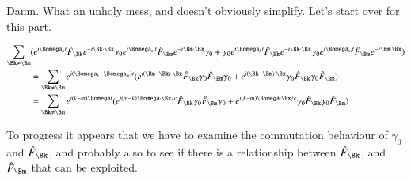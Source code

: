 \documentclass{article}
\begin{document}
Damn.  What an unholy mess, and doesn't obviously simplify.  Let's start over for this part.

\begin{align*}
\sum_{\Bk \ne \Bm} &(
e^{i \Bomega_k t} 
\hat{F}_{\Bk} 
e^{-i \Bk \cdot \Bx} 
\gamma_0 
e^{i \Bomega_m t} 
\hat{F}_{\Bm} 
e^{-i \Bm \cdot \Bx} 
\gamma_0
+ \gamma_0 
e^{i \Bomega_k t} 
\hat{F}_{\Bk} 
e^{-i \Bk \cdot \Bx} 
\gamma_0 
e^{i \Bomega_m t} 
\hat{F}_{\Bm} 
e^{-i \Bm \cdot \Bx} 
) \\
&=
\sum_{\Bk \ne \Bm} 
e^{i (\Bomega_k -\Bomega_m) t}
(
e^{ i (\Bm -\Bk)\cdot \Bx} 
\hat{F}_{\Bk} 
\gamma_0 
\hat{F}_{\Bm} 
\gamma_0
+ 
e^{ i (\Bk -\Bm) \cdot \Bx} 
\gamma_0 
\hat{F}_{\Bk} 
\gamma_0 
\hat{F}_{\Bm} 
) \\
&=
\sum_{\Bk \ne \Bm} 
e^{i (k-m) \Bomega t}
(
e^{ i (m -k) \Bomega \cdot \Bx/c} 
\hat{F}_{\Bk} 
\gamma_0 
\hat{F}_{\Bm} 
\gamma_0
+ 
e^{ i (k -m) \Bomega \cdot \Bx/c} 
\gamma_0 
\hat{F}_{\Bk} 
\gamma_0 
\hat{F}_{\Bm} 
) \\
\end{align*}

To progress it appears that we have to examine the commutation behaviour of $\gamma_0$ and $\hat{F}_{\Bk}$, and probably also to 
see if there is a relationship between 
$\hat{F}_{\Bk}$, and
$\hat{F}_{\Bm}$ that can be exploited.



\end{document}
